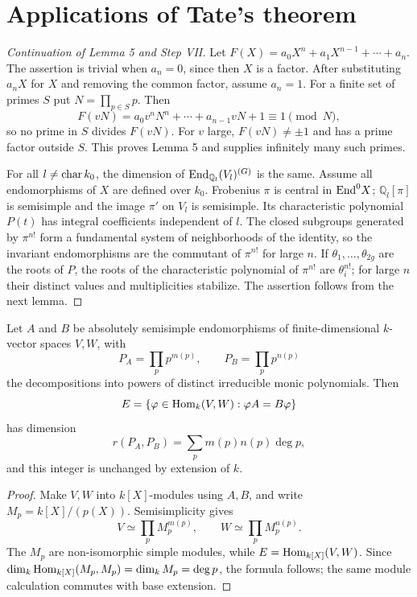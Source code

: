 
\section{Applications of Tate's theorem}
\label{mumford-appendix-I-applications-source}

\begin{proof}[Continuation of Lemma 5 and Step VII]
Let $F(X)=a_0X^n+a_1X^{n-1}+\cdots+a_n$. The assertion is trivial when
$a_n=0$, since then $X$ is a factor. After substituting $a_nX$ for $X$ and
removing the common factor, assume $a_n=1$. For a finite set of primes $S$ put
$N=\prod_{p\in S}p$. Then
\[
 F(vN)=a_0v^nN^n+\cdots+a_{n-1}vN+1\equiv1\pmod N,
\]
so no prime in $S$ divides $F(vN)$. For $v$ large, $F(vN)\ne\pm1$ and has a
prime factor outside $S$. This proves Lemma 5 and supplies infinitely many
such primes.

For all $l\ne {\rm char}\,k_0$, the dimension of
${\rm End}_{\mathbb Q_l}(V_l)^{(G)}$ is the same. Assume all endomorphisms of
$X$ are defined over $k_0$. Frobenius $\pi$ is central in ${\rm End}^0X$;
$\mathbb Q_l[\pi]$ is semisimple and the image $\pi'$ on $V_l$ is semisimple.
Its characteristic polynomial $P(t)$ has integral coefficients independent of
$l$. The closed subgroups generated by $\pi^{n!}$ form a fundamental system of
neighborhoods of the identity, so the invariant endomorphisms are the
commutant of $\pi^{n!}$ for large $n$. If $\theta_1,\ldots,\theta_{2g}$ are
the roots of $P$, the roots of the characteristic polynomial of $\pi^{n!}$
are $\theta_i^{n!}$; for large $n$ their distinct values and multiplicities
stabilize. The assertion follows from the next lemma.
\end{proof}
\begin{lemma}
\label{mumford-lem-appI-commutant-dimension}
Let $A$ and $B$ be absolutely semisimple endomorphisms of finite-dimensional
$k$-vector spaces $V,W$, with
\[
 P_A=\prod_p p^{m(p)},\qquad P_B=\prod_p p^{n(p)}
\]
the decompositions into powers of distinct irreducible monic polynomials. Then
\[
 E=\{\varphi\in{\rm Hom}_k(V,W):\varphi A=B\varphi\}
\]
has dimension
\[
 r(P_A,P_B)=\sum_p m(p)n(p)\deg p,
\]
and this integer is unchanged by extension of $k$.
\end{lemma}
\begin{proof}
Make $V,W$ into $k[X]$-modules using $A,B$, and write
$M_p=k[X]/(p(X))$. Semisimplicity gives
\[
 V\simeq\prod_pM_p^{m(p)},\qquad W\simeq\prod_pM_p^{n(p)}.
\]
The $M_p$ are non-isomorphic simple modules, while
$E={\rm Hom}_{k[X]}(V,W)$. Since
$\dim_k{\rm Hom}_{k[X]}(M_p,M_p)=\dim_kM_p=\deg p$, the formula follows;
the same module calculation commutes with base extension.

\end{proof}


